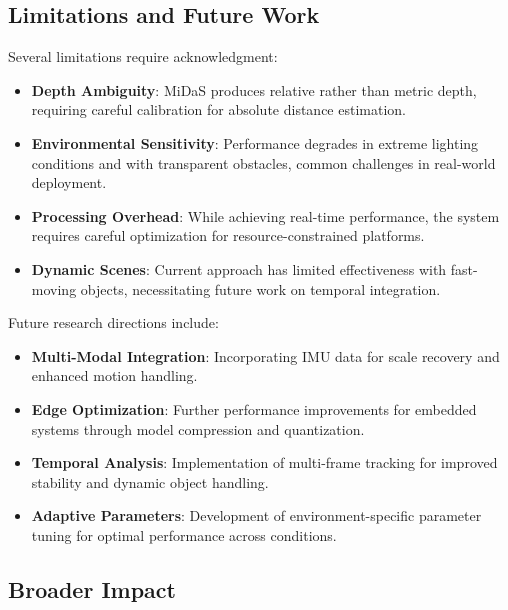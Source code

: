 \documentclass[12pt]{article}
\begin{document}
\subsection{Limitations and Future Work}

Several limitations require acknowledgment:

\begin{itemize}
\item \textbf{Depth Ambiguity}: MiDaS produces relative rather than metric depth, requiring careful calibration for absolute distance estimation.

\item \textbf{Environmental Sensitivity}: Performance degrades in extreme lighting conditions and with transparent obstacles, common challenges in real-world deployment.

\item \textbf{Processing Overhead}: While achieving real-time performance, the system requires careful optimization for resource-constrained platforms.

\item \textbf{Dynamic Scenes}: Current approach has limited effectiveness with fast-moving objects, necessitating future work on temporal integration.
\end{itemize}

Future research directions include:

\begin{itemize}
\item \textbf{Multi-Modal Integration}: Incorporating IMU data for scale recovery and enhanced motion handling.

\item \textbf{Edge Optimization}: Further performance improvements for embedded systems through model compression and quantization.

\item \textbf{Temporal Analysis}: Implementation of multi-frame tracking for improved stability and dynamic object handling.

\item \textbf{Adaptive Parameters}: Development of environment-specific parameter tuning for optimal performance across conditions.
\end{itemize}

\subsection{Broader Impact}
\end{document}
